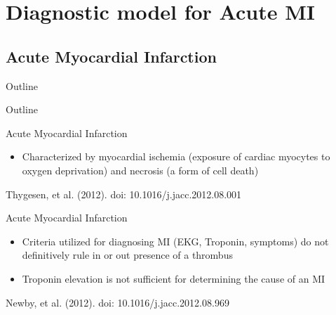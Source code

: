 \documentclass[xcolor=dvipsnames]{beamer}
\begin{document}
\section{Diagnostic model for Acute MI}
\subsection{Acute Myocardial Infarction}
\begin{frame}{Outline}
	\vspace{-10.5pt}
	\tableofcontents[currentsection,subsectionstyle=hide]
\end{frame}

\begin{frame}{Outline}
	\vspace{-10.5pt}
	\tableofcontents[currentsection,subsectionstyle=show/shaded/hide]
\end{frame}

\begin{frame}{Acute Myocardial Infarction}
	\vspace{-5pt}
	\begin{itemize}
		\item Characterized by myocardial ischemia (exposure of cardiac myocytes to oxygen deprivation) and necrosis (a form of cell death)
	\end{itemize}
	\begin{center}
		
		Thygesen, et al. (2012). doi: 10.1016/j.jacc.2012.08.001
	\end{center}
\end{frame}

\begin{frame}{Acute Myocardial Infarction}
		\vspace{-5pt}
		\begin{itemize}
			\item Criteria utilized for diagnosing MI (EKG, Troponin, symptoms) do not definitively rule in or out presence of a thrombus 
			\item Troponin elevation is not sufficient for determining the cause of an MI 
		\end{itemize}
		\begin{center}
			
			Newby, et al. (2012). doi: 10.1016/j.jacc.2012.08.969
		\end{center}
\end{frame}
\end{document}
